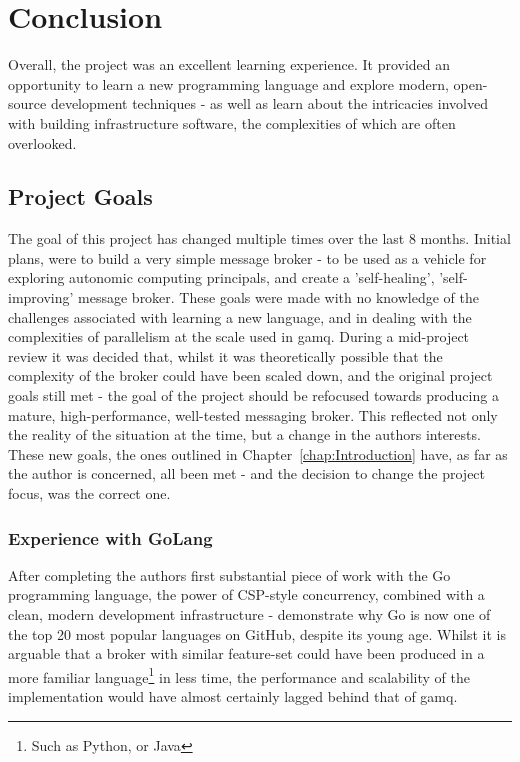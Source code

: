 \chapter{Conclusion}
\label{chap:Conclusion}

Overall, the project was an excellent learning experience. It provided an
opportunity to learn a new programming language and explore modern, open-source
development techniques - as well as learn about the intricacies involved with
building infrastructure software, the complexities of which are often
overlooked.

\section{Project Goals}
\label{sec:goalsConclusion}

The goal of this project has changed multiple times over the last 8 months.
Initial plans, were to build a very simple message broker - to be used as a
vehicle for exploring autonomic computing principals, and create a
'self-healing', 'self-improving' message broker. These goals were made with no
knowledge of the challenges associated with learning a new language, and in
dealing with the complexities of parallelism at the scale used in gamq. During a
mid-project review it was decided that, whilst it was theoretically possible
that the complexity of the broker could have been scaled down, and the original
project goals still met - the goal of the project should be refocused towards
producing a mature, high-performance, well-tested messaging broker. This
reflected not only the reality of the situation at the time, but a change in the
authors interests. These new goals, the ones outlined in
Chapter~\ref{chap:Introduction} have, as far as the author is concerned, all
been met - and the decision to change the project focus, was the correct one.

\subsection{Experience with GoLang}
\label{sub:golangConclusion}

After completing the authors first substantial piece of work with the Go
programming language, the power of CSP-style concurrency, combined with a clean,
modern development infrastructure - demonstrate why Go is now one of the top 20
most popular languages on GitHub\cite{languageRankings}, despite its young age.
Whilst it is arguable that a broker with similar feature-set could have been
produced in a more familiar language\footnote{Such as Python, or Java} in less
time, the performance and scalability of the implementation would have almost
certainly lagged behind that of gamq.

